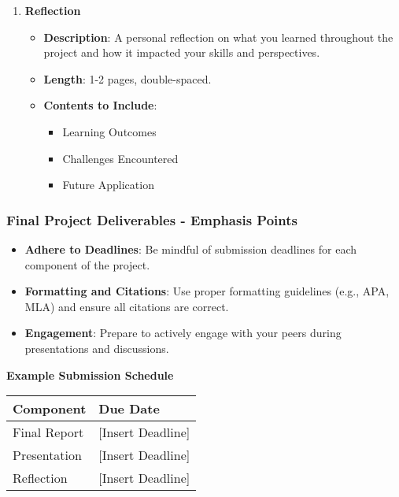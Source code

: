\documentclass{beamer}
\begin{document}
\begin{frame}[fragile]
\begin{enumerate}
        \item \textbf{Reflection}
            \begin{itemize}
                \item \textbf{Description}: A personal reflection on what you learned throughout the project and how it impacted your skills and perspectives.
                \item \textbf{Length}: 1-2 pages, double-spaced.
                \item \textbf{Contents to Include}:
                    \begin{itemize}
                        \item Learning Outcomes
                        \item Challenges Encountered
                        \item Future Application
                    \end{itemize}
            \end{itemize}
    \end{enumerate}
\end{frame}

\begin{frame}[fragile]
    \frametitle{Final Project Deliverables - Emphasis Points}
    \begin{itemize}
        \item \textbf{Adhere to Deadlines}: Be mindful of submission deadlines for each component of the project.
        \item \textbf{Formatting and Citations}: Use proper formatting guidelines (e.g., APA, MLA) and ensure all citations are correct.
        \item \textbf{Engagement}: Prepare to actively engage with your peers during presentations and discussions.
    \end{itemize}
    
    \textbf{Example Submission Schedule}
    \begin{center}
        \begin{tabular}{|l|l|}
            \hline
            \textbf{Component} & \textbf{Due Date} \\
            \hline
            Final Report & [Insert Deadline] \\
            Presentation & [Insert Deadline] \\
            Reflection & [Insert Deadline] \\
            \hline
        \end{tabular}
    \end{center}
\end{frame}
\end{document}
